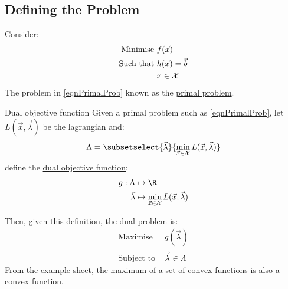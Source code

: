 \documentclass[../Main.tex]{subfiles}
\begin{document}
\subsection{Defining the Problem}
Consider:
\begin{align}
    \text{Minimise } &f(\vec{x}) \nonumber\\
    \text{Such that } &h(\vec{x}) = \vec{b} \label{eqnPrimalProb} \\
    &x \in \mathcal{X} \nonumber
\end{align}
The problem in \ref{eqnPrimalProb} known as the \underline{primal problem}.
\begin{definition}{Dual objective function}
    Given a primal problem such as \ref{eqnPrimalProb}, let $L(\vec{x}, \vec{\lambda})$ be the lagrangian and:
    \begin{equation*}
        \Lambda = \subsetselect{\vec{\lambda}}{\min_{\vec{x} \in \Xset} L(\vec{x}, \vec{\lambda})}
    \end{equation*}
    define the \underline{dual objective function}:
    \begin{align*}
        g : \Lambda &\mapsto \R \\
        \vec{\lambda} &\mapsto \min_{\vec{x} \in \Xset} L(\vec{x}, \vec{\lambda})
    \end{align*}
\end{definition}
Then, given this definition, the \underline{dual problem} is:
\begin{align}
    \text{Maximise } &g(\vec{\lambda}) \nonumber\\
    \text{Subject to } &\vec{\lambda} \in \Lambda \label{eqnDualProb}
\end{align}
From the example sheet, the maximum of a set of convex functions is also a convex function.
\end{document}
